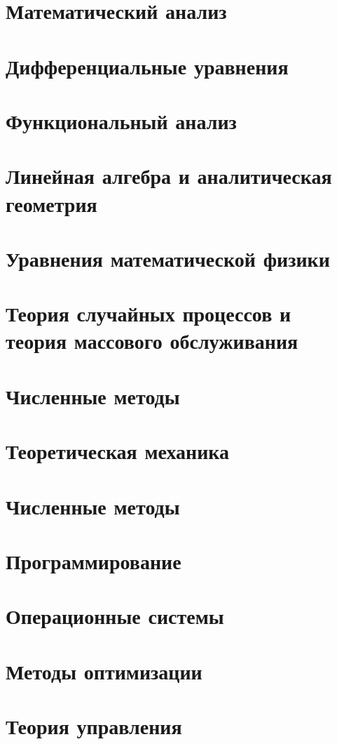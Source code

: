\documentclass[12pt,a4paper]{article}
\begin{document}
\section{Математический анализ}


\section{Дифференциальные уравнения}


\section{Функциональный анализ}


\section{Линейная алгебра и аналитическая геометрия}


\section{Уравнения математической физики}


\section{Теория случайных процессов и теория массового обслуживания}


\section{Численные методы}


\section{Теоретическая механика}


\section{Численные методы}


\section{Программирование}


\section{Операционные системы}


\section{Методы оптимизации}


\section{Теория управления}

\end{document}
